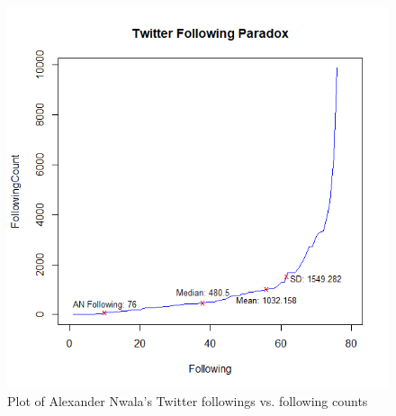 \documentclass[letterpaper,11pt]{article}
\begin{document}
\begin{figure}[h]
\centering
\includegraphics[scale=0.6]{twtfl.png}
\caption{Plot of Alexander Nwala's  Twitter followings vs. following counts}
\label{fig:q2follow}
\end{figure}


\clearpage

\end{document}
